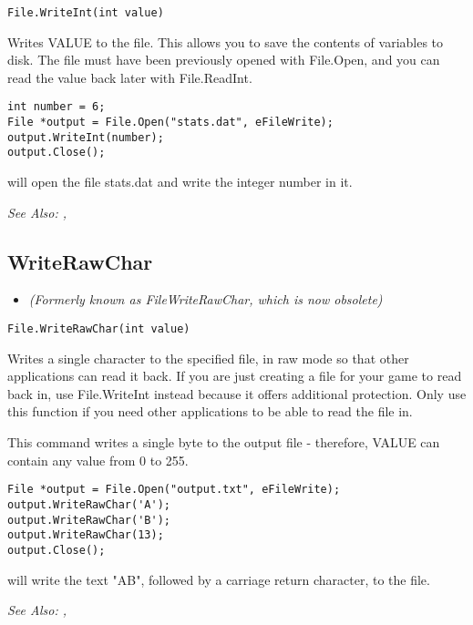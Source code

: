 \begin{verbatim}
File.WriteInt(int value)
\end{verbatim}
Writes VALUE to the file. This allows you to save the contents of
variables to disk. The file must have been previously opened with File.Open,
and you can read the value back later with File.ReadInt.

\begin{verbatim}
int number = 6;
File *output = File.Open("stats.dat", eFileWrite);
output.WriteInt(number);
output.Close();
\end{verbatim}
will open the file stats.dat and write the integer number in it.

\it{See Also:} , 


\subsection{WriteRawChar}\label{File.WriteRawChar}%

\begin{itemize}
\item \it{(Formerly known as FileWriteRawChar, which is now obsolete)}
\end{itemize}

\begin{verbatim}
File.WriteRawChar(int value)
\end{verbatim}
Writes a single character to the specified file, in raw mode so that other
applications can read it back. If you are just creating a file for your
game to read back in, use File.WriteInt instead because it offers additional
protection. Only use this function if you need other applications to be
able to read the file in.

This command writes a single byte to the output file - therefore, VALUE can
contain any value from 0 to 255.

\begin{verbatim}
File *output = File.Open("output.txt", eFileWrite);
output.WriteRawChar('A');
output.WriteRawChar('B');
output.WriteRawChar(13);
output.Close();
\end{verbatim}
will write the text "AB", followed by a carriage return character, to the file.

\it{See Also:} , 


